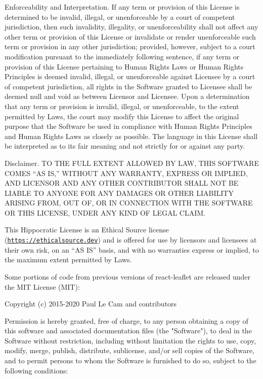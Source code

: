 \begin{DoxyItemize}
\item Enforceability and Interpretation. If any term or provision of this License is determined to be invalid, illegal, or unenforceable by a court of competent jurisdiction, then such invalidity, illegality, or unenforceability shall not affect any other term or provision of this License or invalidate or render unenforceable such term or provision in any other jurisdiction; provided, however, subject to a court modification pursuant to the immediately following sentence, if any term or provision of this License pertaining to Human Rights Laws or Human Rights Principles is deemed invalid, illegal, or unenforceable against Licensee by a court of competent jurisdiction, all rights in the Software granted to Licensee shall be deemed null and void as between Licensor and Licensee. Upon a determination that any term or provision is invalid, illegal, or unenforceable, to the extent permitted by Laws, the court may modify this License to affect the original purpose that the Software be used in compliance with Human Rights Principles and Human Rights Laws as closely as possible. The language in this License shall be interpreted as to its fair meaning and not strictly for or against any party.
\item Disclaimer. TO THE FULL EXTENT ALLOWED BY LAW, THIS SOFTWARE COMES “\+AS IS,” WITHOUT ANY WARRANTY, EXPRESS OR IMPLIED, AND LICENSOR AND ANY OTHER CONTRIBUTOR SHALL NOT BE LIABLE TO ANYONE FOR ANY DAMAGES OR OTHER LIABILITY ARISING FROM, OUT OF, OR IN CONNECTION WITH THE SOFTWARE OR THIS LICENSE, UNDER ANY KIND OF LEGAL CLAIM.
\end{DoxyItemize}

This Hippocratic License is an Ethical Source license (\href{https://ethicalsource.dev}{\texttt{https:\+/\+/\+ethicalsource.\+dev}}) and is offered for use by licensors and licensees at their own risk, on an “\+AS IS” basis, and with no warranties express or implied, to the maximum extent permitted by Laws.

Some portions of code from previous versions of react-\/leaflet are released under the MIT License (MIT):\+

Copyright (c) 2015-\/2020 Paul Le Cam and contributors

Permission is hereby granted, free of charge, to any person obtaining a copy of this software and associated documentation files (the "{}\+Software"{}), to deal in the Software without restriction, including without limitation the rights to use, copy, modify, merge, publish, distribute, sublicense, and/\+or sell copies of the Software, and to permit persons to whom the Software is furnished to do so, subject to the following conditions:\+

